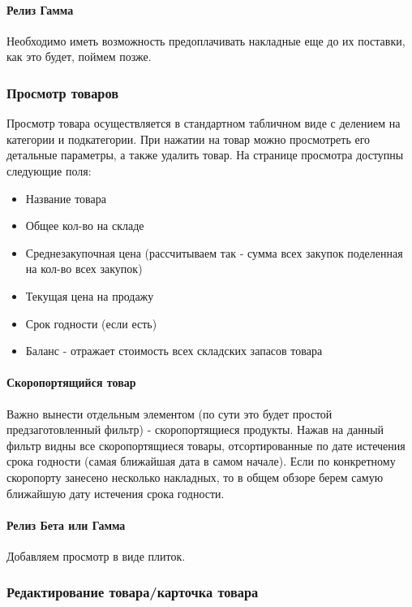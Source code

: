 \documentclass[DIV=calc, paper=a4, fontsize=11pt]{scrartcl} %
\begin{document}
\paragraph{Релиз Гамма}

Необходимо иметь возможность предоплачивать накладные еще до их поставки, как это будет, поймем позже.

\subsubsection{Просмотр товаров}

Просмотр товара осуществляется в стандартном табличном виде с делением на категории и подкатегории. При нажатии на товар можно просмотреть его детальные параметры, а также удалить товар. На странице просмотра доступны следующие поля:

\begin{itemize}
	\item Название товара
	\item Общее кол-во на складе
	\item Среднезакупочная цена (рассчитываем так - сумма всех закупок поделенная на кол-во всех закупок)
	\item Текущая цена на продажу
	\item Срок годности (если есть)
	\item Баланс - отражает стоимость всех складских запасов товара	
\end{itemize}


\paragraph{Скоропортящийся товар}
Важно вынести отдельным элементом (по сути это будет простой предзаготовленный фильтр) - скоропортящиеся продукты. Нажав на данный фильтр видны все скоропортящиеся товары, отсортированные по дате истечения срока годности (самая ближайшая дата в самом начале). Если по конкретному скоропорту занесено несколько накладных, то в общем обзоре берем самую ближайшую дату истечения срока годности.

\paragraph{Релиз Бета или Гамма}
Добавляем просмотр в виде плиток.

\subsubsection{Редактирование товара/карточка товара}
\end{document}
